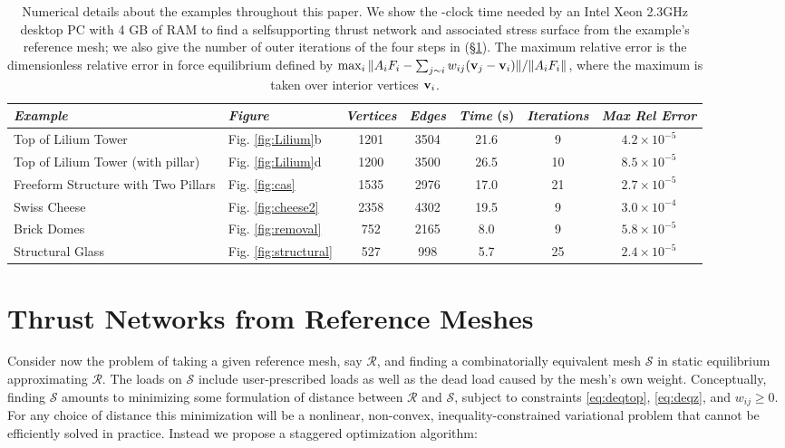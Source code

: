 \documentclass[review]{acmsiggraph}
\def\SS{{\mathcal S}}
\def\RR{{\mathcal R}}
\newcommand{\secref}[1]{(\S\ref{#1})}
\begin{document}
\begin{table}[t]
	\medskip
\begin{tabular}{@{}llccccc@{}}
\hline
	\textit{Example} 
		& \textit{Figure} 
		& \textit{Vertices}  
		& \textit{Edges} 
			& \textit{Time} (s) 
			& \textit{Iterations} 
			& \textit{Max Rel Error} \\
	\hline
		Top of Lilium Tower 
		& Fig. \ref{fig:Lilium}b
		& 1201 
		& 3504 
			& 21.6 
			& 9 
			& $4.2 \times 10^{-5}$
	\\ Top of Lilium Tower (with pillar) 
		& Fig. \ref{fig:Lilium}d
		& 1200 
		& 3500 
			& 26.5 
			& 10 
			& $8.5 \times 10^{-5}$
	\\ Freeform Structure with Two Pillars 
		& Fig. \ref{fig:cas} 
		& 1535 
		& 2976 
			& 17.0 
			& 21 
			& $2.7\times 10^{-5}$
	\\ Swiss Cheese 
		& Fig. \ref{fig:cheese2} 
		& 2358 
		& 4302 
			& 19.5 
			& 9 
			& $3.0 \times 10^{-4}$
	\\ Brick Domes 
		& Fig. \ref{fig:removal} 
		& 752 
		& 2165 
			& 8.0 
			& 9 
			& $5.8 \times 10^{-5}$
	\\ Structural Glass 
		& Fig. \ref{fig:structural} 
		& 527 
		& 998 
			& 5.7 
			& 25 
			& $2.4\times 10^{-5}$
	\\ \hline
  \end{tabular}
	\medskip
	\caption{Numerical details about the examples throughout this 
paper. We show the -clock time needed by an Intel Xeon 2.3GHz 
desktop PC with 4 GB of RAM to find a self\dash supporting thrust network and 
associated stress surface from the example's reference mesh; we also give 
the number of outer iterations of the four steps in \secref{sec:opt}. The 
maximum relative error is the dimensionless relative error in force 
equilibrium defined by $\max_i \| A_i F_i - \sum\nolimits_{j\sim i} w_{ij} 
({\mathbf v}_j-{\mathbf v}_i) \|/\|A_i F_i\|$, where the maximum is taken over interior vertices ${\mathbf v}_i$. 
} \label{table:data}


\end{table}


\section{Thrust Networks from Reference Meshes} \label{sec:opt} 

Consider now the problem of taking a given reference mesh, say $\RR$, and 
finding a combinatorially equivalent mesh $\SS$ in static equilibrium 
approximating $\RR$. The loads on $\SS$ include user-prescribed loads as 
well as the dead load caused by the mesh's own weight. Conceptually, 
finding $\SS$ amounts to minimizing some formulation of distance between 
$\RR$ and $\SS$, subject to constraints \eqref{eq:deqtop}, 
\eqref{eq:deqz}, and $w_{ij} \geq 0$. For any choice of distance this 
minimization will be a nonlinear, non-convex, inequality-constrained 
variational problem that cannot be efficiently solved in practice. Instead 
we propose a staggered optimization algorithm:
\end{document}
